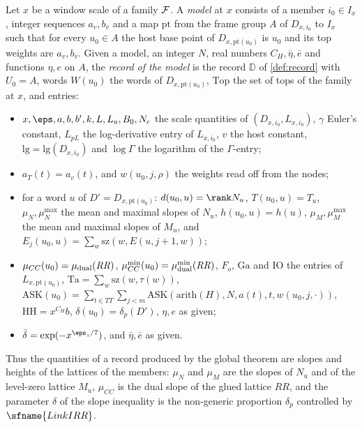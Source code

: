 \begin{definition}\label{pf:top-shape:model}
Let $x$ be a window scale of a family $\mathcal{F}$. A \emph{model} at $x$ consists of a member $i_0\in I_x$, integer
sequences $a_v,b_v$ and a map $\mathrm{pt}$ from the frame group $A$ of $D_{x,i_0}$ to $I_x$ such that for every $u_0\in A$
the host base point of $D_{x,\mathrm{pt}(u_0)}$ is $u_0$ and its top weights are $a_v,b_v$. Given a model, an integer
$N$, real numbers $C_H,\bar\eta,\bar e$ and functions $\eta,e$ on $A$, the \emph{record of the model} is the record
$\mathbb D$ of \cref{def:record} with $U_0=A$, words $W(u_0)$ the words of $D_{x,\mathrm{pt}(u_0)}$,
$\mathrm{Top}$ the set of tops of the family at $x$, and entries:
\begin{itemize}
\item $x,\eps,a,b,b',k,L,L_a,B_0,N_c$ the scale quantities of $(D_{x,i_0},L_{x,i_0})$, $\gamma$ Euler's constant,
$L_{pL}$ the log-derivative entry of $L_{x,i_0}$, $v$ the host constant, $\mathrm{lg}=\mathrm{lg}(D_{x,i_0})$ and
$\log\Gamma$ the logarithm of the $\Gamma$-entry;
\item $a_T(t)=a_v(t)$, and $w(u_0,j,\rho)$ the weights read off from the nodes;
\item for a word $u$ of $D'=D_{x,\mathrm{pt}(u_0)}$: $d(u_0,u)=\rank N_u$, $T(u_0,u)=T_u$, $\mu_N,\mu_N^{\max}$ the mean and
maximal slopes of $N_u$, $h(u_0,u)=h(u)$, $\mu_M,\mu_M^{\max}$ the mean and maximal slopes of $M_u$, and
$E_j(u_0,u)=\sum_w\mathrm{sz}(w,E(u,j+1,w))$;
\item $\mu_{CC}(u_0)=\mu_{\rm dual}(\mathit{RR})$, $\mu^{\min}_{CC}(u_0)=\mu^{\min}_{\rm dual}(\mathit{RR})$, $F_o$, $\mathrm{Ga}$
and $\mathrm{IO}$ the entries of $L_{x,\mathrm{pt}(u_0)}$, $\mathrm{Ta}=\sum_w\mathrm{sz}(w,\tau(w))$,
$\mathrm{ASK}(u_0)=\sum_{t\in TT}\sum_{j<m}\mathrm{ASK}(\mathrm{arith}(H),N,a(t),t,w(u_0,j,\cdot))$,
$\mathrm{HH}=x^{C_H}b$, $\delta(u_0)=\delta_p(D')$, $\eta,e$ as given;
\item $\bar\delta=\exp(-x^{\eps_z/7})$, and $\bar\eta,\bar e$ as given.
\end{itemize}
\end{definition}

Thus the quantities of a record produced by the global theorem are slopes and heights of the lattices of the members:
$\mu_N$ and $\mu_M$ are the slopes of $N_u$ and of the level-zero lattice $M_u$, $\mu_{CC}$ is the dual slope of the glued
lattice $\mathit{RR}$, and the parameter $\delta$ of the slope inequality is the non-generic proportion $\delta_p$
controlled by $\sfname{LinkIRR}$.

